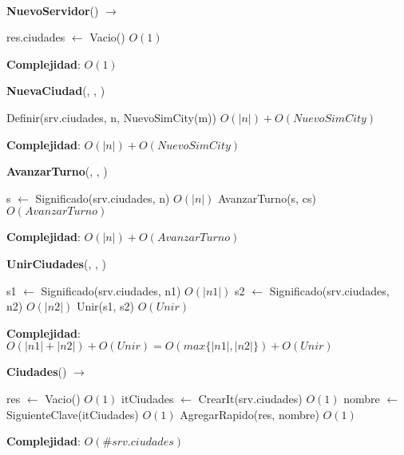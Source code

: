 ~

\begin{Algoritmos}

\begin{algorithm}[H]{\textbf{NuevoServidor}() $\to$ }
\begin{algorithmic}[1]
    \State res.ciudades $\gets$ Vacio() \Comment $O(1)$
\end{algorithmic}
\textbf{Complejidad}: $O(1)$
\end{algorithm}

\begin{algorithm}[H]{\textbf{NuevaCiudad}(, , )}
\begin{algorithmic}[1]
    \State Definir(srv.ciudades, n, NuevoSimCity(m)) \Comment $O(|n|) + O(NuevoSimCity)$
\end{algorithmic}
\textbf{Complejidad}: $O(|n|) + O(NuevoSimCity)$
\end{algorithm}

\begin{algorithm}[H]{\textbf{AvanzarTurno}(, , )}
\begin{algorithmic}[1]
    \State s $\gets$ Significado(srv.ciudades, n) \Comment $O(|n|)$
    \State AvanzarTurno(s, cs) \Comment $O(AvanzarTurno)$
\end{algorithmic}
\textbf{Complejidad}: $O(|n|) + O(AvanzarTurno)$
\end{algorithm}

\begin{algorithm}[H]{\textbf{UnirCiudades}(, , )}
\begin{algorithmic}[1]
    \State s1 $\gets$ Significado(srv.ciudades, n1) \Comment $O(|n1|)$
    \State s2 $\gets$ Significado(srv.ciudades, n2) \Comment $O(|n2|)$
    \State Unir(s1, s2) \Comment $O(Unir)$
\end{algorithmic}
\textbf{Complejidad}: $O(|n1| + |n2|) + O(Unir) = O(max\{|n1|, |n2|\}) + O(Unir)$
\end{algorithm}

\begin{algorithm}[H]{\textbf{Ciudades}() $\to$ }
\begin{algorithmic}[1]
    \State res $\gets$ Vacio() \Comment $O(1)$
    \State itCiudades $\gets$ CrearIt(srv.ciudades) \Comment $O(1)$
     
        \State nombre $\gets$ SiguienteClave(itCiudades) \Comment $O(1)$
        \State AgregarRapido(res, nombre) \Comment $O(1)$
    \EndWhile
\end{algorithmic}
\textbf{Complejidad}: $O(\#srv.ciudades)$
\end{algorithm}


\end{Algoritmos}
